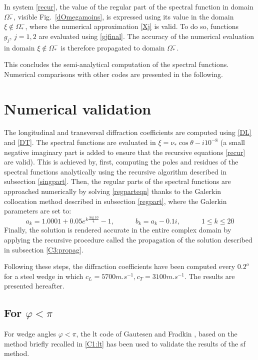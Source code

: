 In system \eqref{recur}, the value of the regular part of the spectral function in domain $\Omega_*^-$, visible Fig.~\ref{dOmegamoins}, is expressed using its value in the domain $\xi \notin \Omega_*^-$, where the numerical approximation \eqref{Xj} is valid. To do so, functions $g_j,\, j=1,2$ are evaluated using \eqref{gjfinal}. The accuracy of the numerical evaluation in domain $\xi \notin \Omega_*^-$ is therefore propagated to domain $\Omega_*^-$. 

This concludes the semi-analytical computation of the spectral functions. Numerical comparisons with other codes are presented in the following.


\section{Numerical validation}
\label{C3:numval}
The longitudinal and transversal diffraction coefficients are computed using \eqref{DL} and \eqref{DT}. The spectral functions are evaluated in $\xi=\nu_*\cos\theta -i10^{-8}$ (a small negative imaginary part is added to ensure that the recursive equations \eqref{recur} are valid). This is achieved by, first, computing the poles and residues of the spectral functions analytically using the recursive algorithm described in subsection \ref{singpart}. Then, the regular parts of the spectral functions are approached numerically by solving \eqref{regparteqn} thanks to the Galerkin collocation method described in subsection \ref{regpart}, where the Galerkin parameters are set to:
\begin{equation}
a_k=1.0001+0.05e^{k\frac{\log 10}{4}}-1, \hspace{3em} b_k=a_k-0.1i, \hspace{3em} 1\leq k\leq20
\end{equation}
Finally, the solution is rendered accurate in the entire complex domain by applying the recursive procedure called the propagation of the solution described in subsection \ref{C3:propag}.

Following these steps, the diffraction coefficients have been computed every $0.2 ^o$ for a steel wedge in which $c_L=5700 m.s^{-1}, c_T=3100 m.s^{-1}$. The results are presented hereafter.
\subsection{For $\varphi<\pi$}
For wedge angles $\varphi<\pi$, the \acrfull{lt} code of Gautesen and Fradkin \cite{GautesenFradkin}, based on the method briefly recalled in \ref{C1:lt} has been used to validate the results of the \acrfull{sf} method. 

